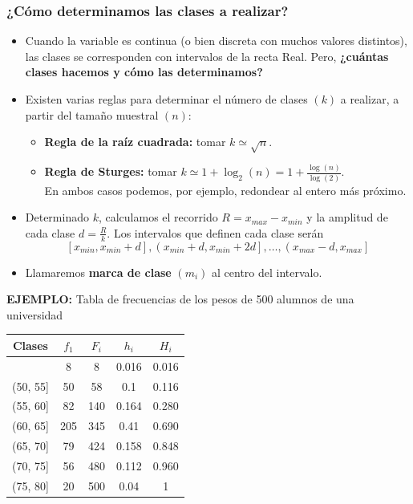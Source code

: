 \subsubsection*{¿Cómo determinamos las clases a realizar?}
\begin{itemize}
	\item Cuando la variable es continua (o bien discreta con muchos valores distintos), las clases se corresponden con intervalos de la recta Real. Pero, \textbf{¿cuántas clases hacemos y cómo las determinamos?}
	\item Existen varias reglas para determinar el número de clases $(k)$ a realizar, a partir del tamaño muestral $(n)$:
	\begin{itemize}
		\item \textbf{Regla de la raíz cuadrada:} tomar $k\simeq \sqrt{n}$.
		\item \textbf{Regla de Sturges:} tomar $k\simeq 1+\log_{2}(n)=1+\frac{\log(n)}{\log(2)}$.\\En ambos casos podemos, por ejemplo, redondear al entero más próximo.
	\end{itemize}
	\item Determinado $k$, calculamos el recorrido $R=x_{max}-x_{min}$ y la amplitud de cada clase $d=\frac{R}{k}$. Los intervalos que definen cada clase serán $$\left[x_{min},x_{min}+d\right], \left(x_{min}+d,x_{min}+2d\right], \hdots, \left(x_{max}-d,x_{max}\right]$$
	\item Llamaremos \textbf{marca de clase} $(m_{i})$ al centro del intervalo.
\end{itemize}
\textbf{EJEMPLO:} Tabla de frecuencias de los pesos de 500 alumnos de una universidad
\begin{center}
	\begin{tabular}{| c | c | c | c | c |}
		\hline
		\hline
		Clases   & $f_{1}$ & $F_{i}$ & $h_{i}$ & $H_{i}$ \\
		\hline
		\hline
		[45,50]  & 8       & 8       & 0.016   & 0.016   \\
		(50, 55] & 50      & 58      & 0.1     & 0.116   \\
		(55, 60] & 82      & 140     & 0.164   & 0.280   \\
		(60, 65] & 205     & 345     & 0.41    & 0.690   \\
		(65, 70] & 79      & 424     & 0.158   & 0.848   \\
		(70, 75] & 56      & 480     & 0.112   & 0.960   \\
		(75, 80] & 20      & 500     & 0.04    & 1       \\ \hline
	\end{tabular}
\end{center}
